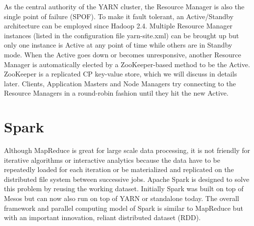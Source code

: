\documentclass[11pt]{book}
\begin{document}
As the central authority of the YARN cluster, the Resource Manager is also the single point of failure (SPOF). To make it fault tolerant, an Active/Standby architecture can be employed since Hadoop 2.4. Multiple Resource Manager instances (listed in the configuration file yarn-site.xml) can be brought up but only one instance is Active at any point of time while others are in Standby mode. 
When the Active goes down or becomes unresponsive, another Resource Manager is automatically elected by a ZooKeeper-based method to be the Active. ZooKeeper is a replicated CP key-value store, which we will discuss in details later. Clients, Application Masters and Node Managers try connecting to the Resource Managers in a round-robin fashion until they hit the new Active. 

\chapter[Spark]
{Spark}
 Although MapReduce is great for large scale data processing, it is not friendly for iterative algorithms or interactive analytics because the data have to be repeatedly loaded for each iteration or be materialized and replicated on the distributed file system between successive jobs. Apache Spark \cite{Zaharia:2010:SCC, Zaharia:2012:RDD, Spark} is designed to solve this problem by reusing the working dataset. Initially Spark was built on top of Mesos but can now also run on top of YARN or standalone today. The overall framework and parallel computing model of Spark is similar to MapReduce but with an important innovation, reliant distributed dataset (RDD).
\end{document}
